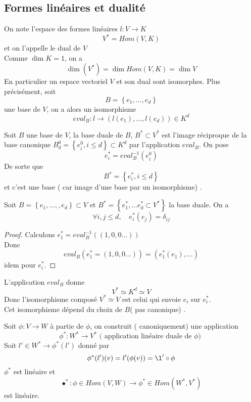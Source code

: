 \documentclass[../main.tex]{subfiles}
\begin{document}
\subsection{Formes linéaires et dualité}
\begin{defn}
On note l'espace des formes linéaires $l: V \to K$ 
\[ 
	V^{*} = Hom( V, K) 
\]
et on l'appelle le dual de $V$ \\
Comme $\dim K = 1$, on a
\[ 
	\dim ( V^{*}) = \dim Hom( V,K)  = \dim V
\]
En particulier un espace vectoriel $V$ et son dual sont isomorphes. Plus précisément, soit
\[ 
B = \left\{ e_1, \ldots, e_d \right\} 
\]
une base de $V$, on a alors un isomorphisme
\[ 
	eval_B: l \to ( l( e_1) , \ldots, l( e_d) ) \in K^{d}
\]

\end{defn}
\begin{defn}
Soit $B$ une base de $V$, la base duale de $B$, $B^{*}\subset V^{*}$ est l'image réciproque de la base canonique $B_d^{0} = \left\{ e_i^{0},i \leq d \right\} \subset K^{d}$ par l'application $eval_B$. On pose
\[ 
	e_i^{*}= eval_B^{-1}( e_i^{0}) 
\]
De sorte que
\[ 
B^{*}= \left\{ e_i^{*}, i \leq d \right\} 
\]
et c'est une base ( car image d'une base par un isomorphisme) .
\end{defn}

\begin{propo}
Soit $B= \left\{ e_1, \ldots,, e_d \right\} \subset V$ et $B^{*}= \left\{ e_1^{*}, \ldots e_d^{*}\subset V^{*} \right\} $ la base duale. On a
\[ 
	\forall i, j \leq d, \quad e_i^{*}( e_j) = \delta_{ij} 
\]


\end{propo}
\begin{proof}
	Calculons $e_1^{*} = eval_B^{-1}( ( 1,0,0\ldots) ) $\\
	Donc 
	\[ 
		eval_B( e_1^{*}= ( 1,0,0\ldots) ) = ( e_1^{*}( e_1) ,\ldots) 
	\]
	idem pour $e_i^{*}$.
	
\end{proof}
\begin{rmq}
L'application $eval_B$ donne
\[ 
V^{*} \simeq K^{d} \simeq V
\]
Donc l'isomorphisme composé $V^{*}\simeq V$ est celui qui envoie $e_i$ sur $e_i^{*}$.\\
Cet isomorphisme dépend du choix de $B$( pas canonique) .
\end{rmq}
\begin{defn}
	Soit $\phi:V \to W$ à partie de $\phi$, on construit ( canoniquement) une application
	\[ 
		\phi^{*}: W^{*}\to V^{*} \text{ ( application linéaire duale de $\phi$)  } 
	\]
	Soit $l' \in W^{*} \to \phi^{*}( l') $ donné par
	\[ 
		\phi^{*}( l') ( v) = l'( \phi( v) ) = \l' \circ \phi
	\]
	$\phi^{*}$ est linéaire et
	\[ 
		\bullet ^{*}: \phi \in Hom( V,W)  \to \phi^{*} \in Hom( W^{*}, V^{*}) 
	\]
	est linéaire.
	

\end{defn}
\end{document}
